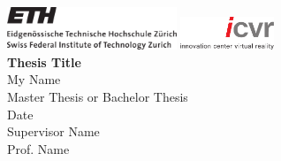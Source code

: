 \documentclass[paper=a4,twoside=true,fontsize=11pt,numbers=noendperiod,chapterprefix=false]{scrbook}
\begin{document}
%


\newcommand{\mykeyword}[0]{my long text}
\newcommand{\chpref}[1]{Chapter \ref{#1}}
\newcommand{\secref}[1]{Section \ref{#1}}
\newcommand{\figref}[1]{Figure \ref{#1}}
\newcommand{\tabref}[1]{Table \ref{#1}}
\newcommand{\apxref}[1]{Appendix \ref{#1}}

\setcounter{page}{-1}  %
\begin{titlepage}
	\topmargin -3.8cm
	\oddsidemargin 0.0cm
	\evensidemargin 0.0cm
	\centering
	\includegraphics*[width=0.38\textwidth]{figures/title/ETH_logo} \hfill
	\includegraphics*[width=0.21\textwidth]{figures/title/loco_icvr} \\
	\vspace{8.2cm}
	\Huge
	\textbf{\textsf{Thesis Title}} \\[2.0cm]
	\vspace{5.0cm}
	\sffamily
	\Large
	My Name
	\\[0.8cm]
	\large
	Master Thesis or Bachelor Thesis
	\\
	Date
	\\[0.8cm] %
	Supervisor Name
	\\[0.5cm]
	Prof. Name
	\vfill
\end{titlepage}
\end{document}
